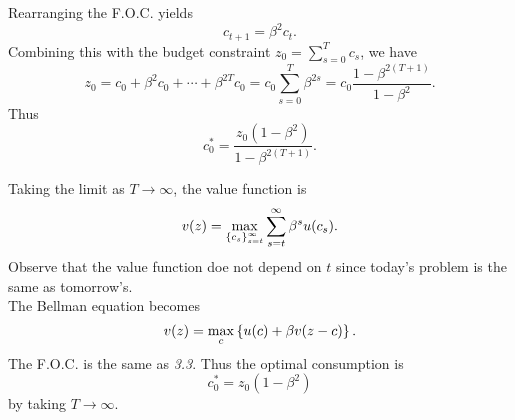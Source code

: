 \documentclass[12pt]{article}
\begin{document}
\begin{sol}[3.3]
    Rearranging the F.O.C. yields 
    \begin{equation*}
        c_{t+1} = \beta^2 c_t.
    \end{equation*}
    Combining this with the budget constraint $z_0 = 
    \sum_{s=0}^{T}c_s$, we have 
    \begin{equation*}
        z_0 = c_0 + \beta^2 c_0 + \cdots + \beta^{2T}c_0 
        = c_0 \sum_{s=0}^{T} \beta^{2s} = c_0 \frac{1-\beta^{2(T+1)}}{1-\beta^2}.
    \end{equation*}
    Thus 
    \begin{equation*}
        c^*_0 = \frac{z_0(1-\beta^2)}{1-\beta^{2(T+1)}}.
    \end{equation*}
    \solend
\end{sol}
\begin{sol}[3.4]
    Taking the limit as $T\to\infty$, the value function is 
    \begin{equation*}
        v(z) = \max_{\left\{ {c_s} \right\}_{s=t}^\infty} \sum_{s=t}^\infty \beta^s u(c_s). 
    \end{equation*}
    Observe that the value function doe not depend on $t$ since 
    today's problem is the same as tomorrow's. \\
    The Bellman equation becomes
    \begin{equation*}
        v(z) = \max_{c} \left\{ {u(c) + \beta v(z-c)} \right\}.
    \end{equation*}
    The F.O.C. is the same as \textit{3.3}. Thus the optimal 
    consumption is 
    \begin{equation*}
        c^*_0 = z_0(1-\beta^2)
    \end{equation*}
    by taking $T\to\infty$.
    \solend
\end{sol}
\end{document}

